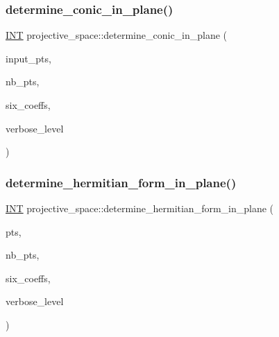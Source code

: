 \subsubsection{\texorpdfstring{determine\+\_\+conic\+\_\+in\+\_\+plane()}{determine\_conic\_in\_plane()}}
{\footnotesize\ttfamily \mbox{\hyperlink{galois_8h_a09fddde158a3a20bd2dcadb609de11dc}{I\+NT}} projective\+\_\+space\+::determine\+\_\+conic\+\_\+in\+\_\+plane (\begin{DoxyParamCaption}\item[{\mbox{\hyperlink{galois_8h_a09fddde158a3a20bd2dcadb609de11dc}{I\+NT}} $\ast$}]{input\+\_\+pts,  }\item[{\mbox{\hyperlink{galois_8h_a09fddde158a3a20bd2dcadb609de11dc}{I\+NT}}}]{nb\+\_\+pts,  }\item[{\mbox{\hyperlink{galois_8h_a09fddde158a3a20bd2dcadb609de11dc}{I\+NT}} $\ast$}]{six\+\_\+coeffs,  }\item[{\mbox{\hyperlink{galois_8h_a09fddde158a3a20bd2dcadb609de11dc}{I\+NT}}}]{verbose\+\_\+level }\end{DoxyParamCaption})}

\mbox{\label{classprojective__space_a20267bad9f354993ddc8b1c36220a874}} 
\subsubsection{\texorpdfstring{determine\+\_\+hermitian\+\_\+form\+\_\+in\+\_\+plane()}{determine\_hermitian\_form\_in\_plane()}}
{\footnotesize\ttfamily \mbox{\hyperlink{galois_8h_a09fddde158a3a20bd2dcadb609de11dc}{I\+NT}} projective\+\_\+space\+::determine\+\_\+hermitian\+\_\+form\+\_\+in\+\_\+plane (\begin{DoxyParamCaption}\item[{\mbox{\hyperlink{galois_8h_a09fddde158a3a20bd2dcadb609de11dc}{I\+NT}} $\ast$}]{pts,  }\item[{\mbox{\hyperlink{galois_8h_a09fddde158a3a20bd2dcadb609de11dc}{I\+NT}}}]{nb\+\_\+pts,  }\item[{\mbox{\hyperlink{galois_8h_a09fddde158a3a20bd2dcadb609de11dc}{I\+NT}} $\ast$}]{six\+\_\+coeffs,  }\item[{\mbox{\hyperlink{galois_8h_a09fddde158a3a20bd2dcadb609de11dc}{I\+NT}}}]{verbose\+\_\+level }\end{DoxyParamCaption})}

